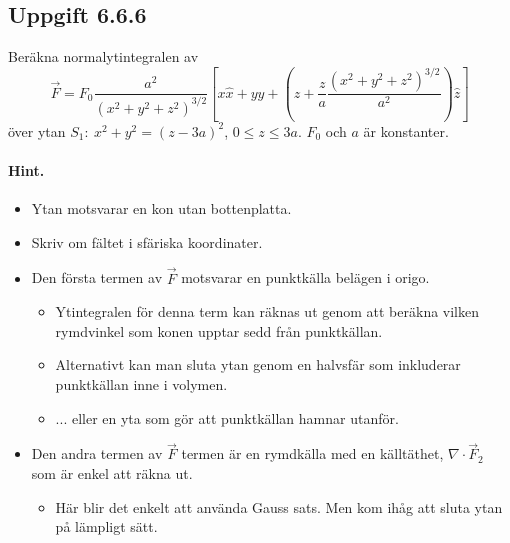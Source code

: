 \documentclass[%
oneside,                 %
final,                   %
10pt]{article}
\newenvironment{doconceexercise}{}{}
\newcounter{doconceexercisecounter}
\begin{document}
\begin{doconceexercise}

\subsection*{Uppgift 6.6.6}

Beräkna normalytintegralen av
\begin{equation}
\vec{F}= F_0 \frac{a^2}{(x^2+y^2+z^2)^{3/2}} \left[ x \hat{x}  + y \hat{y} 
+ \left( z + \frac{z}{a} \frac{(x^2+y^2+z^2)^{3/2}}{a^2} \right) \hat{z} \right ]
\end{equation}
över ytan $S_1:\ x^2+y^2=(z-3a)^2$, $0\leq z\leq 3a$. $F_0$ och $a$ är konstanter.


\paragraph{Hint.}
\begin{itemize}
\item Ytan motsvarar en kon utan bottenplatta.

\item Skriv om fältet i sfäriska koordinater. 

\item Den första termen av $\vec{F}$ motsvarar en punktkälla belägen i origo.
\begin{itemize}

  \item Ytintegralen för denna term kan räknas ut genom att beräkna vilken rymdvinkel som konen upptar sedd från punktkällan.

  \item Alternativt kan man sluta ytan genom en halvsfär som inkluderar punktkällan inne i volymen.

  \item ... eller en yta som gör att punktkällan hamnar utanför.

\end{itemize}

\noindent
\item Den andra termen av $\vec{F}$ termen är en rymdkälla med en källtäthet, $\nabla \cdot \vec{F}_2$ som är enkel att räkna ut.
\begin{itemize}

  \item Här blir det enkelt att använda Gauss sats. Men kom ihåg att sluta ytan på lämpligt sätt.
\end{itemize}


\end{itemize}
\end{doconceexercise}
\end{document}
